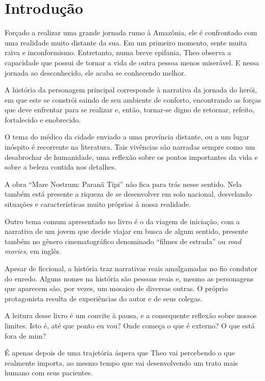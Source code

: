 \documentclass[12pt]{extarticle}
\begin{document}
\section{Introdução}

Forçado a realizar uma grande jornada rumo à Amazônia, ele é confrontado com
uma realidade muito distante da sua. Em um primeiro momento, sente muita raiva e inconformismo.
Entretanto, numa breve epifania, Theo observa a capacidade que possui de
tornar a vida de outra pessoa menos miserável.
E nessa jornada ao desconhecido, ele acaba se conhecendo melhor.

A história da personagem principal corresponde à narrativa da jornada do herói, em 
que este se constrói saindo de seu ambiente de conforto, encontrando as forças
que deve enfrentar para se realizar e, então, tornar-se digno de retornar, 
refeito, fortalecido e enobrecido.
 
O tema do médico da cidade enviado a uma província distante, ou a um lugar
inóspito é recorrente na literatura.
Tais vivências são narradas sempre como um desabrochar de humanidade, uma
reflexão sobre os pontos importantes da vida e sobre a beleza contida nos
detalhes.

A obra ``Mare Nostrum: Paranã Tipi'' não fica para trás nesse sentido.
Nela também está presente a riqueza de se desenvolver em solo nacional,
desvelando situações e características muito próprias à nossa realidade.
 
Outro tema comum apresentado no livro é o da viagem de iniciação,
com a narrativa de um jovem que decide
viajar em busca de algum sentido, presente também no gênero cinematográfico 
denominado ``filmes de estrada'' ou \textit{road movies}, em inglês.

Apesar de ficcional, a história traz narrativas reais amalgamadas no fio
condutor do enredo.
Alguns nomes na história são pessoas reais e, mesmo as personagens que
aparecem são, por vezes, um mosaico de diversas outras.  
O próprio protagonista resulta de experiências do autor e de seus colegas. 

A leitura desse livro é um convite à pausa, e a consequente reflexão sobre
nossos limites. Isto é, até que ponto eu vou? Onde começa o que é externo? 
O que está fora de mim?

É apenas depois de uma trajetória áspera que Theo vai percebendo o que
realmente importa, ao mesmo tempo que vai desenvolvendo um trato mais humano
com seus pacientes.
\end{document}
